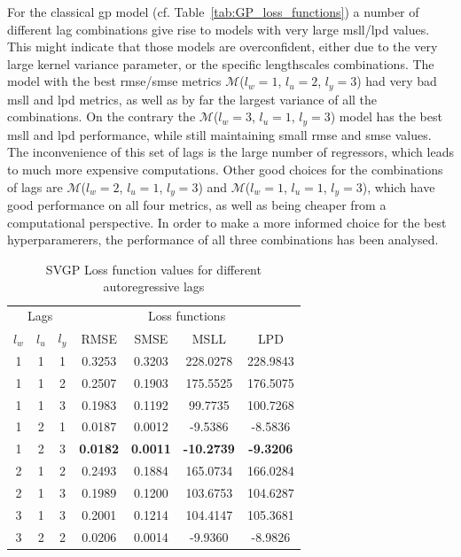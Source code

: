 For the classical \acrshort{gp} model (cf. Table~\ref{tab:GP_loss_functions}) a
number of different lag combinations give rise to models with very large
\acrshort{msll}/\acrshort{lpd} values. This might indicate that those models are
overconfident, either due to the very large kernel variance parameter, or the
specific lengthscales combinations. The model with the best
\acrshort{rmse}/\acrshort{smse} metrics $\mathcal{M}$($l_w = 1$, $l_u = 2$, $l_y
= 3$) had very bad \acrshort{msll} and \acrshort{lpd} metrics, as well as by far
the largest variance of all the combinations. On the contrary the
$\mathcal{M}$($l_w = 3$, $l_u = 1$, $l_y = 3$) model has the best
\acrshort{msll} and \acrshort{lpd} performance, while still maintaining small
\acrshort{rmse} and \acrshort{smse} values. The inconvenience of this set of
lags is the large number of regressors, which leads to much more expensive
computations. Other good choices for the combinations of lags are
$\mathcal{M}$($l_w = 2$, $l_u = 1$, $l_y = 3$) and $\mathcal{M}$($l_w = 1$, $l_u
= 1$, $l_y = 3$), which have good performance on all four metrics, as well as
being cheaper from a computational perspective. In order to make a more informed
choice for the best hyperparamerers, the performance of all three combinations
has been analysed.

\begin{table}[ht]
\centering
    \begin{tabular}{||c c c|c c c c||}
        \hline
        \multicolumn{3}{||c|}{Lags} & \multicolumn{4}{c||}{Loss functions}\\
        $l_w$ & $l_u$ & $l_y$ & RMSE & SMSE & MSLL & LPD\\
        \hline \hline
        1 & 1 & 1 & 0.3253 & 0.3203 & 228.0278 & 228.9843 \\
        1 & 1 & 2 & 0.2507 & 0.1903 & 175.5525 & 176.5075 \\
        1 & 1 & 3 & 0.1983 & 0.1192 & 99.7735 & 100.7268 \\
        1 & 2 & 1 & 0.0187 & 0.0012 & -9.5386 & -8.5836 \\
        1 & 2 & 3 & \textbf{0.0182} & \textbf{0.0011} & \textbf{-10.2739} &
        \textbf{-9.3206} \\
        2 & 1 & 2 & 0.2493 & 0.1884 & 165.0734 & 166.0284 \\
        2 & 1 & 3 & 0.1989 & 0.1200 & 103.6753 & 104.6287 \\
        3 & 1 & 3 & 0.2001 & 0.1214 & 104.4147 & 105.3681 \\
        3 & 2 & 2 & 0.0206 & 0.0014 & -9.9360 & -8.9826 \\
        \hline
    \end{tabular}
\caption{SVGP Loss function values for different autoregressive lags}
\label{tab:SVGP_loss_functions}
\end{table}

